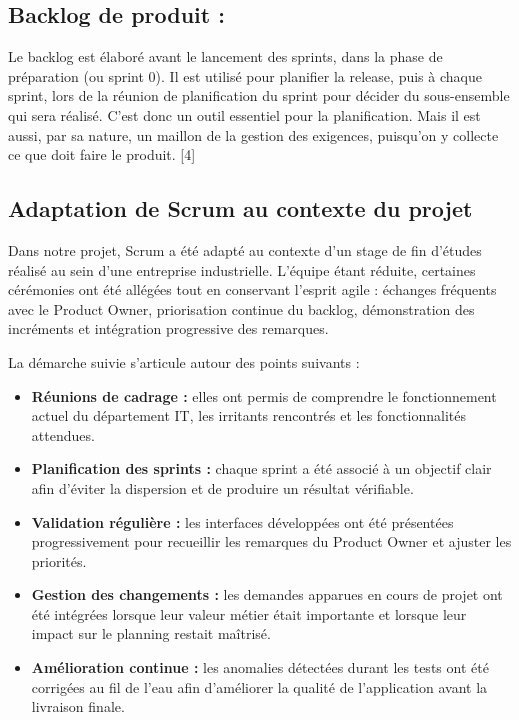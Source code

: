   \subsection{ Backlog de produit :}
     Le backlog est élaboré avant le lancement des sprints, dans la phase de préparation (ou sprint 0). Il est utilisé pour planifier la release, puis à chaque sprint, lors de la réunion de planification du sprint pour décider du sous-ensemble qui sera réalisé. C’est donc un outil essentiel pour la planification. Mais il est aussi, par sa nature, un maillon de la gestion des exigences, puisqu’on y collecte ce que doit faire le produit. [4]


  \subsection{Adaptation de Scrum au contexte du projet}

Dans notre projet, Scrum a été adapté au contexte d'un stage de fin d'études réalisé au sein d'une entreprise industrielle. L'équipe étant réduite, certaines cérémonies ont été allégées tout en conservant l'esprit agile : échanges fréquents avec le Product Owner, priorisation continue du backlog, démonstration des incréments et intégration progressive des remarques.

La démarche suivie s'articule autour des points suivants :

\begin{itemize}[label=\textbullet,font=\normalsize]
    \item \textbf{Réunions de cadrage :} elles ont permis de comprendre le fonctionnement actuel du département IT, les irritants rencontrés et les fonctionnalités attendues.
    \item \textbf{Planification des sprints :} chaque sprint a été associé à un objectif clair afin d'éviter la dispersion et de produire un résultat vérifiable.
    \item \textbf{Validation régulière :} les interfaces développées ont été présentées progressivement pour recueillir les remarques du Product Owner et ajuster les priorités.
    \item \textbf{Gestion des changements :} les demandes apparues en cours de projet ont été intégrées lorsque leur valeur métier était importante et lorsque leur impact sur le planning restait maîtrisé.
    \item \textbf{Amélioration continue :} les anomalies détectées durant les tests ont été corrigées au fil de l'eau afin d'améliorer la qualité de l'application avant la livraison finale.
\end{itemize}

